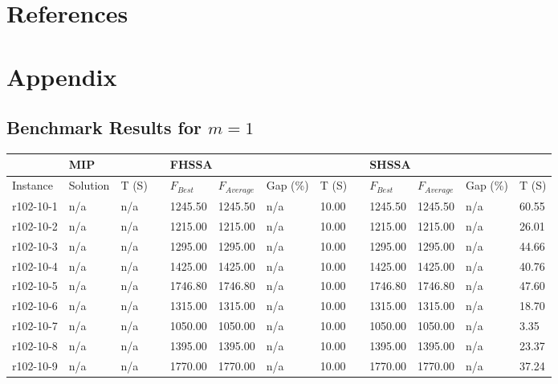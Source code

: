 \documentclass[final,5p,times,twocolumn]{elsarticle}
\begin{document}
{{{{{{{{{{{{{%

\section*{References}



\onecolumn

\section*{Appendix}
\renewcommand{\thesubsection}{\Alph{subsection}}
\subsection{Benchmark Results for $m=1$}
\begin{longtable}{l l l l l l l l l l l l l}
\hline
& \multicolumn{2}{l}{MIP}&&\multicolumn{4}{l}{FHSSA}&& \multicolumn{4}{l}{SHSSA}\\
\hline
Instance & Solution & T (S) & & $F_{Best}$ & $F_{Average}$  & Gap (\%) & T (S) & & $F_{Best}$ & $F_{Average}$  & Gap (\%) & T (S)\\
\hline
\endhead
r102-10-1& n/a& n/a&&1245.50& 1245.50& n/a& 10.00&&1245.50& 1245.50& n/a& 60.55\\
r102-10-2& n/a& n/a&&1215.00& 1215.00& n/a& 10.00&&1215.00& 1215.00& n/a& 26.01\\
r102-10-3& n/a& n/a&&1295.00& 1295.00& n/a& 10.00&&1295.00& 1295.00& n/a& 44.66\\
r102-10-4& n/a& n/a&&1425.00& 1425.00& n/a& 10.00&&1425.00& 1425.00& n/a& 40.76\\
r102-10-5& n/a& n/a&&1746.80& 1746.80& n/a& 10.00&&1746.80& 1746.80& n/a& 47.60\\
r102-10-6& n/a& n/a&&1315.00& 1315.00& n/a& 10.00&&1315.00& 1315.00& n/a& 18.70\\
r102-10-7& n/a& n/a&&1050.00& 1050.00& n/a& 10.00&&1050.00& 1050.00& n/a& 3.35\\
r102-10-8& n/a& n/a&&1395.00& 1395.00& n/a& 10.00&&1395.00& 1395.00& n/a& 23.37\\
r102-10-9& n/a& n/a&&1770.00& 1770.00& n/a& 10.00&&1770.00& 1770.00& n/a& 37.24\\

\end{longtable}}}}}}}}}}}}}}
\end{document}
